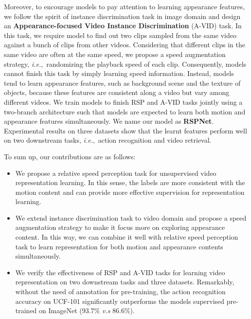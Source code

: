 \documentclass[final]{cvpr}
\def\ie{\mbox{\textit{i.e.}, }}
\begin{document}
Moreover, to encourage models to pay attention to learning appearance features, we follow the spirit of instance discrimination task in image domain and design an \textbf{Appearance-focused Video Instance Discrimination} (A-VID) task.
In this task, we require model to find out two clips sampled from the same video against a bunch of clips from other videos. 
Considering that different clips in the same video are often at the same speed, we propose a speed augmentation strategy, \ie randomizing the playback speed of each clip. Consequently, models cannot finish this task by simply learning speed information.
Instead, models tend to learn appearance features, such as background scene and the texture of objects, because these features are consistent along a video but vary among different videos.
We train models to finish RSP and A-VID tasks jointly using a two-branch architecture such that models are expected to learn both motion and appearance features simultaneously. We name our model as \textbf{RSPNet}.
Experimental results on three datasets show that the learnt features perform well on two downstream tasks, \ie action recognition and video retrieval. 




To sum up, our contributions are as follows:

\begin{itemize}
	
	\item We propose a relative speed perception task for unsupervised video representation learning. In this sense, the labels are more consistent with the motion content and can provide more effective supervision for representation learning.
	
	\item We extend instance discrimination task to video domain and propose a speed augmentation strategy to make it focus more on exploring appearance content. In this way, we can combine it well with relative speed perception task to learn representation for both motion and appearance contents simultaneously.
	
	
	\item We verify the effectiveness of RSP and A-VID tasks for learning video representation on two downstream tasks and three datasets. Remarkably, without the need of annotation for pre-training, the action recognition accuracy on UCF-101 significantly outperforms the models supervised pre-trained on ImageNet (93.7\% \textit{v.s} 86.6\%).
\end{itemize}
\end{document}
